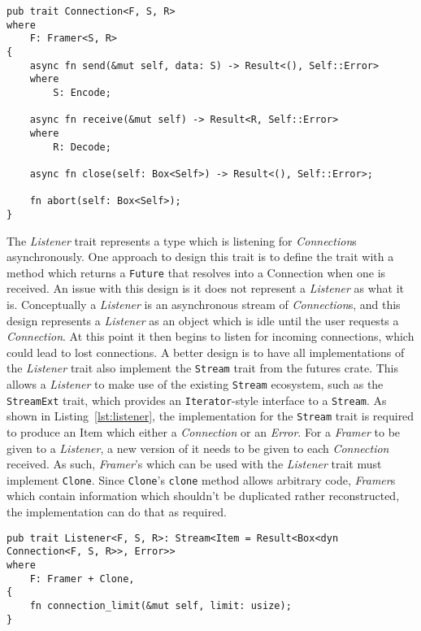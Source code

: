 \begin{lstlisting}[float=h, label=lst:connection, caption={The Connection trait.}]
pub trait Connection<F, S, R>
where
    F: Framer<S, R>
{
    async fn send(&mut self, data: S) -> Result<(), Self::Error>
    where
        S: Encode;

    async fn receive(&mut self) -> Result<R, Self::Error>
    where
        R: Decode;

    async fn close(self: Box<Self>) -> Result<(), Self::Error>;

    fn abort(self: Box<Self>);
}
\end{lstlisting}

The \emph{Listener} trait represents a type which is listening for \emph{Connection}s asynchronously.
One approach to design this trait is to define the trait with a method which returns a \texttt{Future} that resolves
into a Connection when one is received.
An issue with this design is it does not represent a \emph{Listener} as what it is.
Conceptually a \emph{Listener} is an asynchronous stream of \emph{Connection}s, and this design represents a
\emph{Listener} as an object which is idle until the user requests a \emph{Connection}.
At this point it then begins to listen for incoming connections, which could lead to lost connections.
A better design is to have all implementations of the \emph{Listener} trait also implement the \texttt{Stream} trait
from the futures crate.
This allows a \emph{Listener} to make use of the existing \texttt{Stream} ecosystem, such as the \texttt{StreamExt}
trait, which provides an \texttt{Iterator}-style interface to a \texttt{Stream}.
As shown in Listing~\ref{lst:listener}, the implementation for the \texttt{Stream} trait is required to produce an Item
which either a \emph{Connection} or an \emph{Error}.
For a \emph{Framer} to be given to a \emph{Listener}, a new version of it needs to be given to each \emph{Connection}
received.
As such, \emph{Framer}'s which can be used with the \emph{Listener} trait must implement \texttt{Clone}.
Since \texttt{Clone}'s \texttt{clone} method allows arbitrary code, \emph{Framer}s which contain information which
shouldn't be duplicated rather reconstructed, the implementation can do that as required.

\begin{lstlisting}[float=h, label=lst:listener, caption={The Listener trait, showing the Stream
    implementation requirement for all implementers.}]
pub trait Listener<F, S, R>: Stream<Item = Result<Box<dyn Connection<F, S, R>>, Error>>
where
    F: Framer + Clone,
{
    fn connection_limit(&mut self, limit: usize);
}

\end{lstlisting}

